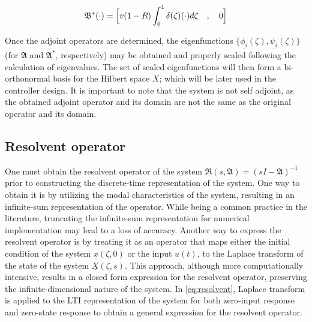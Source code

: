 \begin{equation} \label{eq:adjoint_B}
    \mathfrak{B}^* (\cdot) = \Bigl[ v(1-R) \int_0^1 \delta(\zeta) (\cdot) d\zeta \quad , \quad 0 \Bigr]
\end{equation}

Once the adjoint operators are determined, the eigenfunctions $\{ \underline{\phi_i}(\zeta), \underline{\psi_i}(\zeta) \}$ (for $\mathfrak{A}$ and $\mathfrak{A}^*$, respectively) may be obtained and properly scaled following the calculation of eigenvalues. The set of scaled eigenfunctions will then form a bi-orthonormal basis for the Hilbert space $X$; which will be later used in the controller design. It is important to note that the system is not self adjoint, as the obtained adjoint operator and its domain are not the same as the original operator and its domain.

\subsection{Resolvent operator}

One must obtain the resolvent operator of the system $\mathfrak{R}(s, \mathfrak{A}) = (sI-\mathfrak{A})^{-1}$ prior to constructing the discrete-time representation of the system. One way to obtain it is by utilizing the modal characteristics of the system, resulting in an infinite-sum representation of the operator. While being a common practice in the literature, truncating the infinite-sum representation for numerical implementation may lead to a loss of accuracy. Another way to express the resolvent operator is by treating it as an operator that maps either the initial condition of the system $\underline{x}(\zeta,0)$ or the input $u(t)$, to the Laplace transform of the state of the system $\underline{X}(\zeta, s)$. This approach, although more computationally intensive, results in a closed form expression for the resolvent operator, preserving the infinite-dimensional nature of the system. In \eqref{eq:resolvent}, Laplace transform is applied to the LTI representation of the system for both zero-input response and zero-state response to obtain a general expression for the resolvent operator.

